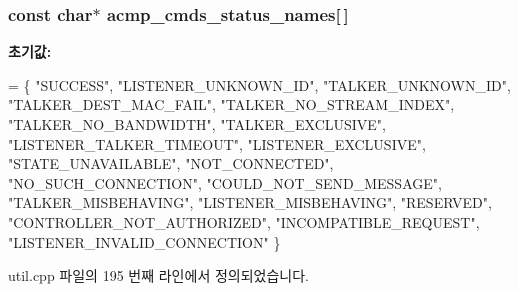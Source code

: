 \subsubsection[{\texorpdfstring{acmp\+\_\+cmds\+\_\+status\+\_\+names}{acmp_cmds_status_names}}]{\setlength{\rightskip}{0pt plus 5cm}const char$\ast$ acmp\+\_\+cmds\+\_\+status\+\_\+names\mbox{[}$\,$\mbox{]}}\hypertarget{namespaceavdecc__lib_1_1utility_a7c11cd6ddc78496fe044bea68ac1fef9}{}\label{namespaceavdecc__lib_1_1utility_a7c11cd6ddc78496fe044bea68ac1fef9}
{\bfseries 초기값\+:}
\begin{DoxyCode}
=
        \{
            \textcolor{stringliteral}{"SUCCESS"},                    
            \textcolor{stringliteral}{"LISTENER\_UNKNOWN\_ID"},        
            \textcolor{stringliteral}{"TALKER\_UNKNOWN\_ID"},          
            \textcolor{stringliteral}{"TALKER\_DEST\_MAC\_FAIL"},       
            \textcolor{stringliteral}{"TALKER\_NO\_STREAM\_INDEX"},     
            \textcolor{stringliteral}{"TALKER\_NO\_BANDWIDTH"},        
            \textcolor{stringliteral}{"TALKER\_EXCLUSIVE"},           
            \textcolor{stringliteral}{"LISTENER\_TALKER\_TIMEOUT"},    
            \textcolor{stringliteral}{"LISTENER\_EXCLUSIVE"},         
            \textcolor{stringliteral}{"STATE\_UNAVAILABLE"},          
            \textcolor{stringliteral}{"NOT\_CONNECTED"},              
            \textcolor{stringliteral}{"NO\_SUCH\_CONNECTION"},         
            \textcolor{stringliteral}{"COULD\_NOT\_SEND\_MESSAGE"},     
            \textcolor{stringliteral}{"TALKER\_MISBEHAVING"},         
            \textcolor{stringliteral}{"LISTENER\_MISBEHAVING"},       
            \textcolor{stringliteral}{"RESERVED"},                   
            \textcolor{stringliteral}{"CONTROLLER\_NOT\_AUTHORIZED"},  
            \textcolor{stringliteral}{"INCOMPATIBLE\_REQUEST"},       
            \textcolor{stringliteral}{"LISTENER\_INVALID\_CONNECTION"} 
    \}
\end{DoxyCode}


util.\+cpp 파일의 195 번째 라인에서 정의되었습니다.

